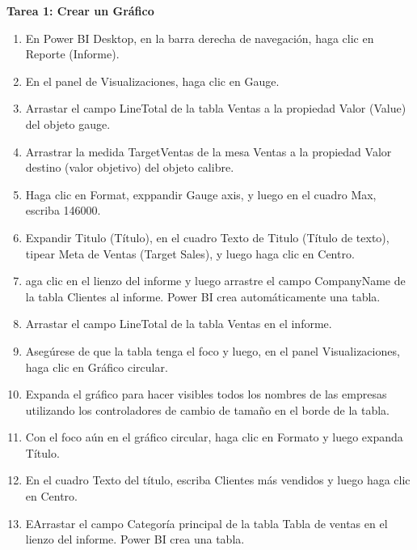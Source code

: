 \begin{itemize}
\textbf{Tarea 1: Crear un Gráfico}
\end{itemize}



\begin{enumerate}

\item En Power BI Desktop, en la barra derecha de navegación, haga clic en Reporte (Informe).

    \item En el panel de Visualizaciones, haga clic en Gauge.

    \item Arrastar el campo LineTotal de la tabla Ventas a la propiedad Valor (Value) del objeto gauge.

    \item Arrastrar la medida TargetVentas de la mesa Ventas a la propiedad Valor destino (valor objetivo) del objeto calibre.
    
    \item Haga clic en Format, exppandir Gauge axis, y luego en el cuadro Max, escriba 146000.
    
    \item Expandir Titulo (Título), en el cuadro Texto de Titulo (Título de texto), tipear Meta de Ventas (Target Sales), y luego haga clic en Centro.


    \item aga clic en el lienzo del informe y luego arrastre el campo CompanyName de la tabla Clientes al informe. Power BI crea automáticamente una tabla.

    \item Arrastar el campo LineTotal de la tabla Ventas en el informe.

    
    \item Asegúrese de que la tabla tenga el foco y luego, en el panel Visualizaciones, haga clic en Gráfico circular.
    
    \item Expanda el gráfico para hacer visibles todos los nombres de las empresas utilizando los controladores de cambio de tamaño en el borde de la tabla.
    
    \item Con el foco aún en el gráfico circular, haga clic en Formato y luego expanda Título.


    \item En el cuadro Texto del título, escriba Clientes más vendidos y luego haga clic en Centro.
    \item EArrastar el campo Categoría principal de la tabla Tabla de ventas en el lienzo del informe. Power BI crea una tabla.
    

\end{enumerate}
